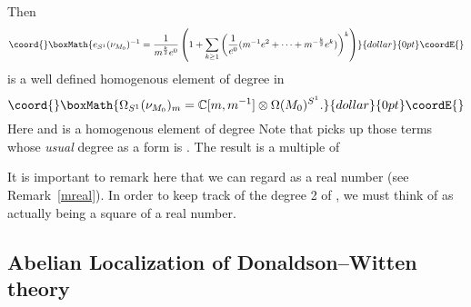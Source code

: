 \documentclass[a4paper,12pt,reqno,sumlimits]{amsart}
\theoremstyle{plain}
\theoremstyle{definition}
\providecommand{\C}{{\mathbb C}}
\providecommand{\1}{{\bf 1}}
\providecommand{\inv}{^{-1}}
\numberwithin{equation}{section}
\begin{document}
Then
$$\coord{}\boxMath{
e_{S^1}(\nu_{M_0})\inv=\frac{1}{m^{\frac{k}{2}}e^0}\left(
  1+\sum_{k\ge 1}\left(\frac{1}{e^0}(m\inv e^2+\cdots+m^{-\frac{k}{2}}e^k)
  \right)^k\right)
}{dollar}{0pt}\coordE{}$$
is a well defined homogenous element of degree \coordHE{} in
$$\coord{}\boxMath{
\Omega_{S^1}(\nu_{M_0})_m=\C[m,m\inv]\otimes\Omega(M_0)^{S^1}.
}{dollar}{0pt}\coordE{}$$
Here \coordHE{} and \myHighlight{$\alpha\mid_{M_0}\cdot e_{S^1}(\nu_{M_0})\inv$}\coordHE{} is a
homogenous element of degree \coordHE{} Note that
\coordHE{} picks up those terms whose {\em usual} degree as a
form is \coordHE{}. The result is a multiple of \coordHE{}

It is important to remark here that we can regard \coordHE{} as a real number (see
Remark~\ref{mreal}). In order to keep track of the degree 2 of \coordHE{}, we must
think of \coordHE{} as actually being a square of a real number.


\subsection{Abelian Localization of Donaldson--Witten theory}
\label{dwabloc}
\end{document}
